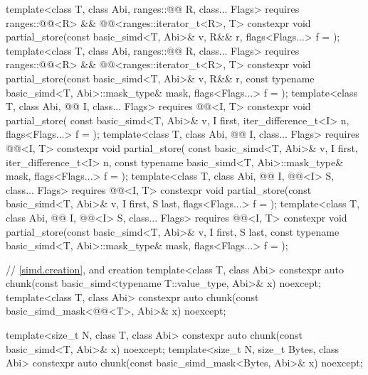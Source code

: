 \begin{codeblock}
{  template<class T, class Abi, ranges::@@ R, class... Flags>
    requires ranges::@@<R> && @@<ranges::iterator_t<R>, T>
    constexpr void partial_store(const basic_simd<T, Abi>& v, R&& r,
                                 flags<Flags...> f = {});
  template<class T, class Abi, ranges::@@ R, class... Flags>
    requires ranges::@@<R> && @@<ranges::iterator_t<R>, T>
    constexpr void partial_store(const basic_simd<T, Abi>& v, R&& r,
      const typename basic_simd<T, Abi>::mask_type& mask, flags<Flags...> f = {});
  template<class T, class Abi, @@ I, class... Flags>
    requires @@<I, T>
    constexpr void partial_store(
      const basic_simd<T, Abi>& v, I first, iter_difference_t<I> n, flags<Flags...> f = {});
  template<class T, class Abi, @@ I, class... Flags>
    requires @@<I, T>
    constexpr void partial_store(
      const basic_simd<T, Abi>& v, I first, iter_difference_t<I> n,
      const typename basic_simd<T, Abi>::mask_type& mask, flags<Flags...> f = {});
  template<class T, class Abi, @@ I, @@<I> S, class... Flags>
    requires @@<I, T>
    constexpr void partial_store(const basic_simd<T, Abi>& v, I first, S last,
                                 flags<Flags...> f = {});
  template<class T, class Abi, @@ I, @@<I> S, class... Flags>
    requires @@<I, T>
    constexpr void partial_store(const basic_simd<T, Abi>& v, I first, S last,
      const typename basic_simd<T, Abi>::mask_type& mask, flags<Flags...> f = {});

  // \ref{simd.creation},  and  creation
  template<class T, class Abi>
    constexpr auto chunk(const basic_simd<typename T::value_type, Abi>& x) noexcept;
  template<class T, class Abi>
    constexpr auto chunk(const basic_simd_mask<@@<T>, Abi>& x) noexcept;

  template<size_t N, class T, class Abi>
    constexpr auto chunk(const basic_simd<T, Abi>& x) noexcept;
  template<size_t N, size_t Bytes, class Abi>
    constexpr auto chunk(const basic_simd_mask<Bytes, Abi>& x) noexcept;

}
\end{codeblock}
